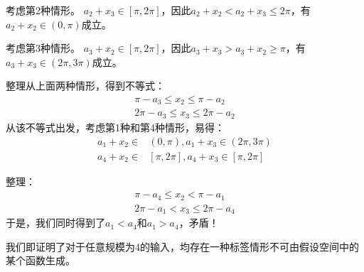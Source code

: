 \documentclass[12pt, a4paper]{article}
\begin{document}
\begin{enumerate}
        考虑第2种情形。
        $a_2 + x_3 \in [\pi, 2 \pi]$，因此$a_2 + x_2 < a_2 + x_3 \le 2 \pi$，有$a_2 + x_2 \in (0, \pi)$成立。

        考虑第3种情形。
        $a_3 + x_2 \in [\pi, 2 \pi]$，因此$a_3 + x_3 > a_3 + x_2 \ge \pi$，有$a_3 + x_3 \in (2 \pi, 3 \pi)$成立。

        整理从上面两种情形，得到不等式：
        \begin{align*}
        \pi - a_3 \le x_2 \le \pi - a_2 \\
        2 \pi - a_3 \le x_3 \le 2 \pi - a_2
        \end{align*}
        从该不等式出发，考虑第1种和第4种情形，易得：
        \begin{align*}
        a_1 + x_2 \in& (0, \pi), a_1 + x_3 \in (2 \pi, 3 \pi) \\
        a_4 + x_2 \in& [\pi, 2\pi], a_4 + x_3 \in [\pi, 2 \pi]
        \end{align*}

        整理：
        \begin{align*}
        \pi - a_4 \le x_2 < \pi - a_1 \\
        2 \pi - a_1 < x_3 \le 2 \pi - a_4
        \end{align*}
        于是，我们同时得到了$a_1 < a_4$和$a_1 > a_4$，矛盾！

        我们即证明了对于任意规模为4的输入，均存在一种标签情形不可由假设空间中的某个函数生成。

    \end{enumerate}
\end{document}
